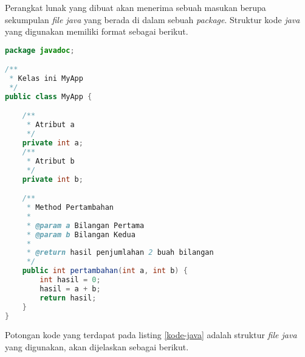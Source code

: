 
Perangkat lunak yang dibuat akan menerima sebuah masukan berupa sekumpulan {\it file java} yang berada di dalam sebuah {\it package}. Struktur kode {\it java} yang digunakan memiliki format sebagai berikut.

\begin{lstlisting}[language=Java, caption=Contoh kode {\it java} yang diuji, label={kode-java}]
package javadoc;

/**
 * Kelas ini MyApp
 */
public class MyApp {

    /**
     * Atribut a
     */
    private int a;
    /**
     * Atribut b
     */
    private int b;

    /**
     * Method Pertambahan
     *
     * @param a Bilangan Pertama
     * @param b Bilangan Kedua
     * 
     * @return hasil penjumlahan 2 buah bilangan
     */
    public int pertambahan(int a, int b) {
        int hasil = 0;
        hasil = a + b;
        return hasil;
    }
}
\end{lstlisting}

Potongan kode yang terdapat pada listing \ref{kode-java} adalah struktur {\it file java} yang digunakan, akan dijelaskan sebagai berikut.

